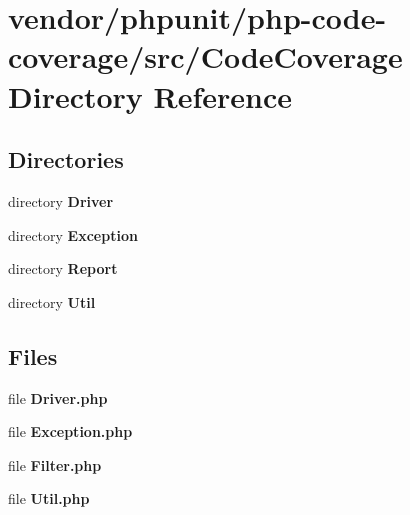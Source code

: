 \section{vendor/phpunit/php-\/code-\/coverage/src/\+Code\+Coverage Directory Reference}
\label{dir_3f32337af8aa7696d15d654e1e358a18}
\subsection*{Directories}
\begin{DoxyCompactItemize}
\item 
directory {\bf Driver}
\item 
directory {\bf Exception}
\item 
directory {\bf Report}
\item 
directory {\bf Util}
\end{DoxyCompactItemize}
\subsection*{Files}
\begin{DoxyCompactItemize}
\item 
file {\bf Driver.\+php}
\item 
file {\bf Exception.\+php}
\item 
file {\bf Filter.\+php}
\item 
file {\bf Util.\+php}
\end{DoxyCompactItemize}
